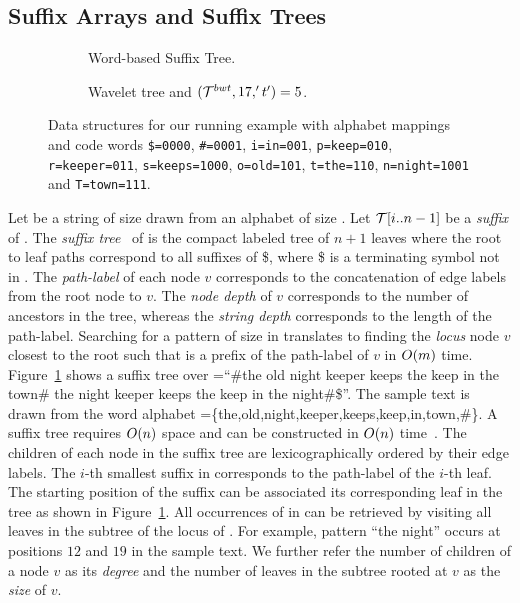 
\subsection{Suffix Arrays and Suffix Trees}

\begin{figure*}[phbt]
\begin{subfigure}[t]{0.5\textwidth}
\centering

\caption{Word-based Suffix Tree.}
\label{fig-suffix-tree}
\end{subfigure}
\quad
\begin{subfigure}[t]{0.5\textwidth}
\centering

\caption{Wavelet tree and \rankop$(\mathcal{T}^{bwt},17,'t')=5$.}
\label{fig-wt-bwt}
\end{subfigure}
\begin{subfigure}[b]{1\textwidth}
\centering

\label{fig-sa-bwt}
\end{subfigure}
\vspace{-0.8cm}
\caption{Data structures for our running example with alphabet mappings and code words {\tt \$=0000}, {\tt \#=0001}, 
{\tt i=in=001}, {\tt p=keep=010}, {\tt r=keeper=011}, {\tt s=keeps=1000}, 
{\tt o=old=101}, {\tt t=the=110}, {\tt n=night=1001} and {\tt T=town=111}.}
\end{figure*}

Let {\col} be a string of size {\collen} drawn from an alphabet {\alphabet} of
size {\alphabetsize}. Let {$\mathcal{T}[i..n-1]$} be a {\it suffix} of {\col}.
The {\it suffix tree}~\cite{w-swat73} of {\col} is the compact labeled
tree of $n+1$ leaves where the root to leaf paths correspond to all suffixes of {\col\$},
where \$ is a terminating symbol not in {\alphabet}. The {\it path-label}
of each node $v$ corresponds to the concatenation of edge labels from the
root node to $v$. The {\it node depth} of $v$ corresponds to the number
of ancestors in the tree, whereas the {\it string depth} corresponds to the
length of the path-label. Searching for a pattern {\pattern} of 
size {\plen} in {\col} translates to finding the {\it locus} node $v$ closest to
the root such that {\pattern} is a prefix of the path-label of $v$ in $O(m)$ time.
Figure~\ref{fig-suffix-tree} shows a suffix tree over {\col=``\#the old night keeper 
keeps the keep in the town\# the night keeper keeps the keep in the night\#\$}''. 
The sample text is drawn from the word alphabet 
{\alphabet=\{the,old,night,keeper,keeps,keep,in,town,\#\}}. A suffix tree requires $O(n)$ space 
and can be constructed in $O(n)$ time~\cite{u-algo95}. The children
of each node in the suffix tree are lexicographically ordered by their edge labels.
The $i$-th smallest suffix in {\col} corresponds to the path-label of the $i$-th 
leaf. The starting position of the suffix can be associated its corresponding
leaf in the tree as shown in Figure~\ref{fig-suffix-tree}. All 
occurrences of {\pattern} in {\col} can be retrieved by visiting all leaves
in the subtree of the locus of {\pattern}. For example, pattern ``the night'' occurs
at positions $12$ and $19$ in the sample text. We further refer the number of children
of a node $v$ as its {\it degree} and the number of leaves in the subtree rooted at $v$
as the {\it size} of $v$.

